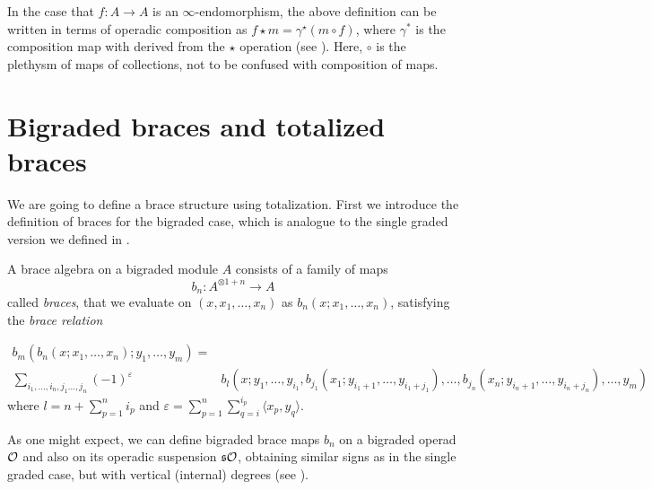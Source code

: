 \documentclass[join.tex]{subfiles}
\begin{document}
In the case that $f:A\to A$ is an $\infty$-endomorphism, the above definition can be written in terms of operadic composition as $f\star m=\gamma^\star(m\circ f)$, where $\gamma^*$ is the composition map with derived from the $\star$ operation (see ). Here, $\circ$ is the plethysm of maps of collections, not to be confused with composition of maps. 


\section{Bigraded braces and totalized braces}\label{sectionbibraces}
We are going to define a brace structure using totalization. First we introduce the definition of braces for the bigraded case, which is analogue to the single graded version we defined in .

\begin{defin}\label{bibraces}
A brace algebra on a bigraded module $A$ consists of a family of maps \[b_n:A^{\otimes 1+n}\to A\] called \emph{braces}, that we evaluate on $(x,x_1,\dots, x_n)$ as $b_n(x;x_1,\dots, x_n)$, satisfying the \emph{brace relation}


\begin{align*}
b_m(b_n(x;x_1,\dots, x_n);y_1,\dots,y_m)=&\\
\sum_{i_1,\dots, i_n, j_1\dots, j_n}(-1)^{\varepsilon}&b_l(x; y_1,\dots, y_{i_1},b_{j_1}(x_1;y_{i_1+1},\dots, y_{i_1+j_1}),\dots, b_{j_n}(x_n;y_{i_n+1},\dots, y_{i_n+j_n}),\dots,y_m)
\end{align*}
where $l=n+\sum_{p=1}^n i_p$ and $\varepsilon=\sum_{p=1}^n\sum_{q=i}^{i_p}\langle x_p,y_q\rangle$.



\end{defin}


As one might expect, we can define bigraded brace maps $b_n$ on a bigraded operad ${\mathcal O}$ and also on its operadic suspension $\mathfrak{s}{\mathcal O}$, obtaining similar signs as in the single graded case, but with vertical (internal) degrees (see ). 
\end{document}
